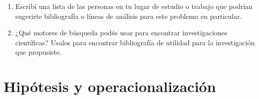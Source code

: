 \documentclass[12pt,spanish,a4paper,]{article}
\begin{document}
\begin{enumerate}
\begin{longtable}[]{@{}llll@{}}
  \begin{minipage}[t]{0.22\columnwidth}\raggedright
  \strut
  \end{minipage} & \begin{minipage}[t]{0.15\columnwidth}\raggedright
  \strut
  \end{minipage} & \begin{minipage}[t]{0.17\columnwidth}\raggedright
  \strut
  \end{minipage} & \begin{minipage}[t]{0.34\columnwidth}\raggedright
  \strut
  \end{minipage}\tabularnewline
  \begin{minipage}[t]{0.22\columnwidth}\raggedright
  \strut
  \end{minipage} & \begin{minipage}[t]{0.15\columnwidth}\raggedright
  \strut
  \end{minipage} & \begin{minipage}[t]{0.17\columnwidth}\raggedright
  \strut
  \end{minipage} & \begin{minipage}[t]{0.34\columnwidth}\raggedright
  \strut
  \end{minipage}\tabularnewline
  \begin{minipage}[t]{0.22\columnwidth}\raggedright
  \strut
  \end{minipage} & \begin{minipage}[t]{0.15\columnwidth}\raggedright
  \strut
  \end{minipage} & \begin{minipage}[t]{0.17\columnwidth}\raggedright
  \strut
  \end{minipage} & \begin{minipage}[t]{0.34\columnwidth}\raggedright
  \strut
  \end{minipage}\tabularnewline
  \bottomrule
  \end{longtable}
\item
  Escribí una lista de las personas en tu lugar de estudio o trabajo que
  podrían sugerirte bibliografía o líneas de análisis para este problema
  en particular.
\item
  ¿Qué motores de búsqueda podés usar para encontrar investigaciones
  científicas? Usalos para encontrar bibliografía de utilidad para la
  investigación que propusiste.
\end{enumerate}

\hypertarget{hipotesis-y-operacionalizacion}{%
\section{Hipótesis y
operacionalización}\label{hipotesis-y-operacionalizacion}}
\end{document}
